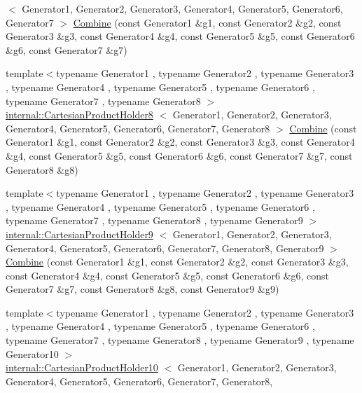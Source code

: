 \begin{DoxyCompactItemize}
$<$ \-Generator1, \-Generator2, \*
\-Generator3, \-Generator4, \*
\-Generator5, \-Generator6, \*
\-Generator7 $>$ \hyperlink{namespacetesting_a314759a93c251ca78b75c7f3ae8eda80}{\-Combine} (const \-Generator1 \&g1, const \-Generator2 \&g2, const \-Generator3 \&g3, const \-Generator4 \&g4, const \-Generator5 \&g5, const \-Generator6 \&g6, const \-Generator7 \&g7)
\item 
{\footnotesize template$<$typename Generator1 , typename Generator2 , typename Generator3 , typename Generator4 , typename Generator5 , typename Generator6 , typename Generator7 , typename Generator8 $>$ }\\\hyperlink{classtesting_1_1internal_1_1CartesianProductHolder8}{internal\-::\-Cartesian\-Product\-Holder8}\*
$<$ \-Generator1, \-Generator2, \*
\-Generator3, \-Generator4, \*
\-Generator5, \-Generator6, \*
\-Generator7, \-Generator8 $>$ \hyperlink{namespacetesting_ac5508abb9d05e22332c792d101c13b2b}{\-Combine} (const \-Generator1 \&g1, const \-Generator2 \&g2, const \-Generator3 \&g3, const \-Generator4 \&g4, const \-Generator5 \&g5, const \-Generator6 \&g6, const \-Generator7 \&g7, const \-Generator8 \&g8)
\item 
{\footnotesize template$<$typename Generator1 , typename Generator2 , typename Generator3 , typename Generator4 , typename Generator5 , typename Generator6 , typename Generator7 , typename Generator8 , typename Generator9 $>$ }\\\hyperlink{classtesting_1_1internal_1_1CartesianProductHolder9}{internal\-::\-Cartesian\-Product\-Holder9}\*
$<$ \-Generator1, \-Generator2, \*
\-Generator3, \-Generator4, \*
\-Generator5, \-Generator6, \*
\-Generator7, \-Generator8, \*
\-Generator9 $>$ \hyperlink{namespacetesting_a928ed7d1e8dd1dde0da5d7d3838384d2}{\-Combine} (const \-Generator1 \&g1, const \-Generator2 \&g2, const \-Generator3 \&g3, const \-Generator4 \&g4, const \-Generator5 \&g5, const \-Generator6 \&g6, const \-Generator7 \&g7, const \-Generator8 \&g8, const \-Generator9 \&g9)
\item 
{\footnotesize template$<$typename Generator1 , typename Generator2 , typename Generator3 , typename Generator4 , typename Generator5 , typename Generator6 , typename Generator7 , typename Generator8 , typename Generator9 , typename Generator10 $>$ }\\\hyperlink{classtesting_1_1internal_1_1CartesianProductHolder10}{internal\-::\-Cartesian\-Product\-Holder10}\*
$<$ \-Generator1, \-Generator2, \*
\-Generator3, \-Generator4, \*
\-Generator5, \-Generator6, \*
\-Generator7, \-Generator8, \*

\end{DoxyCompactItemize}
